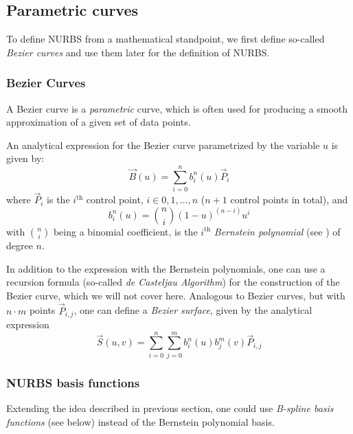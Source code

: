 \subsection{Parametric curves}

To define NURBS from a mathematical standpoint, we first define so-called \emph{Bezier curves} and use them later for the definition of NURBS. 
\subsubsection{Bezier Curves}
A Bezier curve is a \textit{parametric} curve, which is often used for producing a smooth approximation of a given set of data points.
 
An analytical expression for the Bezier curve parametrized by the variable $u$ is given by:
\begin{equation*}
\vec{B}(u)=\sum\limits_{i=0}^n b_i^n(u) \vec{P}_i
\end{equation*}
where $\vec{P}_i$ is the $i^{\text{th}}$ control point, $i\in0,1, \dots ,n$ ($n+1$ control points in total), and
\begin{equation*}
b_i^n(u)=\binom{n}{i}(1-u)^{(n-i)}u^i
\end{equation*}
with $\binom{n}{i}$ being a binomial coefficient, is the $i^{\text{th}}$ \emph{Bernstein polynomial} (see \cite{lorentz2012bernstein}) of degree $n$.

In addition to the expression with the Bernstein polynomials, one can use a recursion formula (so-called \emph{de Casteljau Algorithm}) for the construction of the Bezier curve, which we will not cover here. Analogous to Bezier curves, but with $n\cdot m$ points $\vec{P}_{i,j}$,
one can define a \textit{Bezier surface}, given by the analytical expression
\begin{equation*}
\vec{S}(u,v)=\sum\limits_{i=0}^n \sum\limits_{j=0}^m b_i^n(u) b_j^m(v) \vec{P}_{i,j}
\end{equation*}

\subsubsection{NURBS basis functions}
Extending the idea described in previous section, one could use \emph{B-spline basis functions} (see below) instead of the Bernstein polynomial basis.

